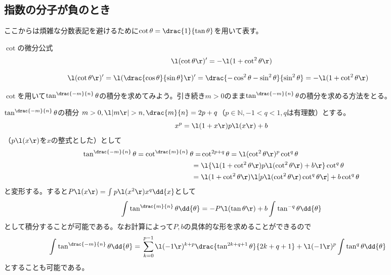 \documentclass[a4j,uplatex,dvipdfmx,10pt]{jsarticle}
\begin{document}
\subsection{指数の分子が負のとき}
\label{ssc:2022-09-15_20-48-30}
ここからは煩雑な分数表記を避けるために\(\cot \theta =\drac{1}{\tan \theta } \)を用いて表す。
\begin{myburgundybox}{\(\cot \)の微分公式}
\begin{equation}
\l(\cot \theta \r)'=-\l(1+\cot ^2 \theta \r)
\label{eqn:2022-09-15_20-54-32}
\end{equation}
\end{myburgundybox}
\begin{prf}[]
\begin{equation}\begin{split}
\l(\cot \theta \r)'= {}& \l(\drac{\cos \theta }{\sin \theta }\r)'=\drac{-\cos ^2 \theta- \sin ^2 \theta  }{\sin ^2 \theta }=-\l(1+\cot^2 \theta \r)
\end{split}\label{eqn:2022-09-15_20-55-16}
\end{equation}
\end{prf}
\(\cot \)を用いて\(\tan ^{\drac{-m}{n}}\theta  \)の積分を求めてみよう。引き続き\(m>0 \)のまま\(\tan ^{\drac{-m}{n}}\theta  \)の積分を求める方法をとる。
\begin{myburgundybox}{\(\tan ^{\drac{-m}{n}}\theta  \)の積分}
	\(m>0,\l|m\r|>n ,\drac{m}{n} =2p+q\)（\(p \in \mathbb{N},-1<q<1, qは有理数 \)）とする。
	\begin{equation}
	x^p=\l(1+x\r)p\l(x\r)+b
	\end{equation}
	（\(p\l(x\r) \)を\(x \)の整式とした）として
\begin{align}
\tan ^{\drac{-m}{n}}\theta=\cot ^{\drac{m}{n}}\theta =& {} \cot ^{2p+q}\theta =\l(\cot ^2\theta \r)^p\cot ^{q}\theta \\
= {}& \l\{\l(1+\cot ^2 \theta \r)p\l(\cot ^2 \theta \r)+b\r\}\cot ^q \theta \\
= {}& \l(1+\cot ^2 \theta \r)\l[p\l(\cot ^2 \theta \r)\cot ^q \theta \r]+b \cot ^q \theta 
\end{align}
と変形する。すると\(P\l(x\r)=\int_{}^{} p\l(x^2\r)x^q\dd{x} \)として
\begin{equation}
\int_{}^{} \tan ^{\drac{m}{n}}\theta \dd{\theta }=-P\l(\tan \theta \r)+b \int_{}^{} \tan ^{-q} \theta \dd{\theta }
\end{equation}
として積分することが可能である。なお計算によって\(P,b \)の具体的な形を求めることができるので
\begin{equation}\begin{split}
	\int_{}^{} \tan ^{\drac{-m}{n}}\theta \dd{\theta }= {}& \sum_{k=0}^{p-1} \l(-1\r)^{k+p}\drac{\tan ^{2k+q+1}\theta }{2k+q+1}+\l(-1\r)^p \int_{}^{} \tan ^q \theta \dd{\theta }
	\end{split}
	\end{equation}
	とすることも可能である。
\end{myburgundybox}
\end{document}
